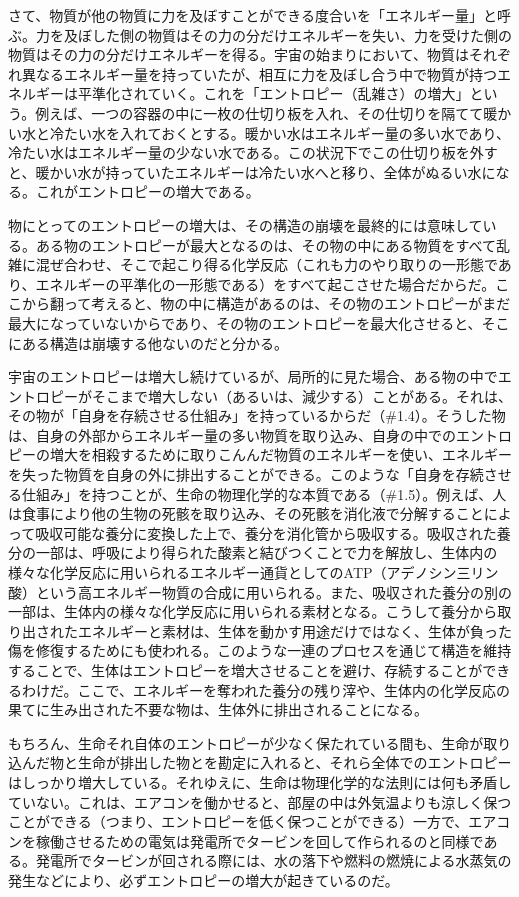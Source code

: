 さて、物質が他の物質に力を及ぼすことができる度合いを「エネルギー量」と呼ぶ。力を及ぼした側の物質はその力の分だけエネルギーを失い、力を受けた側の物質はその力の分だけエネルギーを得る。宇宙の始まりにおいて、物質はそれぞれ異なるエネルギー量を持っていたが、相互に力を及ぼし合う中で物質が持つエネルギーは平準化されていく。これを「エントロピー（乱雑さ）の増大」という。例えば、一つの容器の中に一枚の仕切り板を入れ、その仕切りを隔てて暖かい水と冷たい水を入れておくとする。暖かい水はエネルギー量の多い水であり、冷たい水はエネルギー量の少ない水である。この状況下でこの仕切り板を外すと、暖かい水が持っていたエネルギーは冷たい水へと移り、全体がぬるい水になる。これがエントロピーの増大である。

物にとってのエントロピーの増大は、その構造の崩壊を最終的には意味している。ある物のエントロピーが最大となるのは、その物の中にある物質をすべて乱雑に混ぜ合わせ、そこで起こり得る化学反応（これも力のやり取りの一形態であり、エネルギーの平準化の一形態である）をすべて起こさせた場合だからだ。ここから翻って考えると、物の中に構造があるのは、その物のエントロピーがまだ最大になっていないからであり、その物のエントロピーを最大化させると、そこにある構造は崩壊する他ないのだと分かる。

宇宙のエントロピーは増大し続けているが、局所的に見た場合、ある物の中でエントロピーがそこまで増大しない（あるいは、減少する）ことがある。それは、その物が「自身を存続させる仕組み」を持っているからだ（\#1.4）。そうした物は、自身の外部からエネルギー量の多い物質を取り込み、自身の中でのエントロピーの増大を相殺するために取りこんんだ物質のエネルギーを使い、エネルギーを失った物質を自身の外に排出することができる。このような「自身を存続させる仕組み」を持つことが、生命の物理化学的な本質である（\#1.5）。例えば、人は食事により他の生物の死骸を取り込み、その死骸を消化液で分解することによって吸収可能な養分に変換した上で、養分を消化管から吸収する。吸収された養分の一部は、呼吸により得られた酸素と結びつくことで力を解放し、生体内の様々な化学反応に用いられるエネルギー通貨としてのATP（アデノシン三リン酸）という高エネルギー物質の合成に用いられる。また、吸収された養分の別の一部は、生体内の様々な化学反応に用いられる素材となる。こうして養分から取り出されたエネルギーと素材は、生体を動かす用途だけではなく、生体が負った傷を修復するためにも使われる。このような一連のプロセスを通じて構造を維持することで、生体はエントロピーを増大させることを避け、存続することができるわけだ。ここで、エネルギーを奪われた養分の残り滓や、生体内の化学反応の果てに生み出された不要な物は、生体外に排出されることになる。

もちろん、生命それ自体のエントロピーが少なく保たれている間も、生命が取り込んだ物と生命が排出した物とを勘定に入れると、それら全体でのエントロピーはしっかり増大している。それゆえに、生命は物理化学的な法則には何も矛盾していない。これは、エアコンを働かせると、部屋の中は外気温よりも涼しく保つことができる（つまり、エントロピーを低く保つことができる）一方で、エアコンを稼働させるための電気は発電所でタービンを回して作られるのと同様である。発電所でタービンが回される際には、水の落下や燃料の燃焼による水蒸気の発生などにより、必ずエントロピーの増大が起きているのだ。

